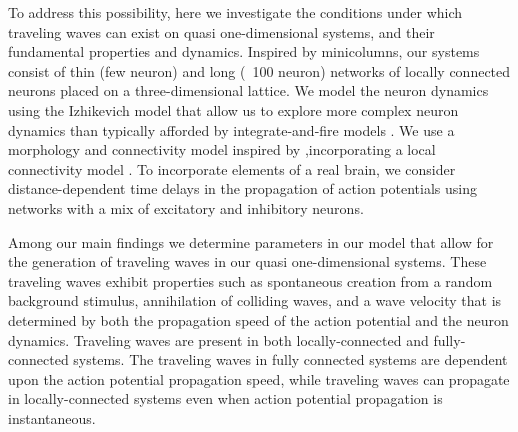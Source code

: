 \documentclass[12pt]{article}
\begin{document}
To address this possibility, here we investigate the conditions under which traveling waves can exist on quasi one-dimensional systems, and their fundamental properties and dynamics.  
Inspired by minicolumns, our systems consist of thin (few neuron) and long (~100 neuron) networks of locally connected neurons placed on a three-dimensional lattice.  
We model the neuron dynamics using the Izhikevich model \parencite{izhikevich2003} that allow us to explore more complex neuron dynamics than typically afforded by integrate-and-fire models \parencite{keane2015}\parencite{Senk2018}.
\color{red}We use a morphology and connectivity model inspired by \parencite{maass2002},incorporating a local connectivity model \parencite{Levy2012}\parencite{Pyle2017}\parencite{Fino2011}\color{black}.
To incorporate elements of a real brain, we consider distance-dependent time delays in the propagation of action potentials using networks with a mix of excitatory and inhibitory neurons.

Among our main findings we determine parameters in our model that allow for the generation of traveling waves in our quasi one-dimensional systems. 
These traveling waves exhibit properties such as spontaneous creation from a random background stimulus, annihilation of colliding waves, and a wave velocity that is determined by both the propagation speed of the action potential and the neuron dynamics.
Traveling waves are present in both locally-connected and fully-connected systems. 
The traveling waves in fully connected systems are dependent upon the action potential propagation speed, while traveling waves can propagate in locally-connected systems even when action potential propagation is instantaneous.
\end{document}
